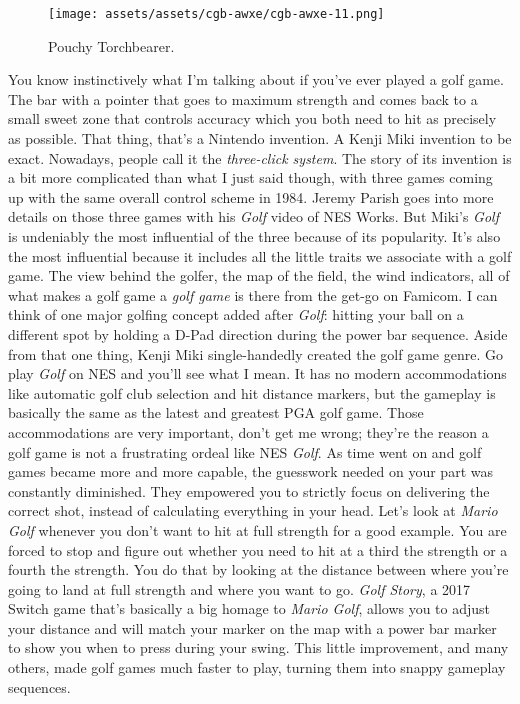 \documentclass{book}
\begin{document}
\begin{figure}[hbt]
\vskip 10pt
\centering \texttt{[image: assets/assets/cgb-awxe/cgb-awxe-11.png]}\par\pagetwodescription Pouchy Torchbearer.
\vskip 6pt
\end{figure}

You know instinctively what I’m talking about if you’ve ever played a golf game. The bar with a pointer that goes to maximum strength and comes back to a small sweet zone that controls accuracy which you both need to hit as precisely as possible. That thing, that’s a Nintendo invention. A Kenji Miki invention to be exact. Nowadays, people call it the \emph{three-click system}. The story of its invention is a bit more complicated than what I just said though, with three games coming up with the same overall control scheme in 1984. Jeremy Parish goes into more details on those three games with his \emph{Golf} video of NES Works. But Miki’s \emph{Golf} is undeniably the most influential of the three because of its popularity. It’s also the most influential because it includes all the little traits we associate with a golf game. The view behind the golfer, the map of the field, the wind indicators, all of what makes a golf game a \emph{golf game} is there from the get-go on Famicom. I can think of one major golfing concept added after \emph{Golf}: hitting your ball on a different spot by holding a D-Pad direction during the power bar sequence. Aside from that one thing, Kenji Miki single-handedly created the golf game genre. Go play \emph{Golf} on NES and you’ll see what I mean. It has no modern accommodations like automatic golf club selection and hit distance markers, but the gameplay is basically the same as the latest and greatest PGA golf game. Those accommodations are very important, don’t get me wrong; they’re the reason a golf game is not a frustrating ordeal like NES \emph{Golf}. As time went on and golf games became more and more capable, the guesswork needed on your part was constantly diminished. They empowered you to strictly focus on delivering the correct shot, instead of calculating everything in your head. Let’s look at \emph{Mario Golf} whenever you don’t want to hit at full strength for a good example. You are forced to stop and figure out whether you need to hit at a third the strength or a fourth the strength. You do that by looking at the distance between where you’re going to land at full strength and where you want to go. \emph{Golf Story}, a 2017 Switch game that’s basically a big homage to \emph{Mario Golf}, allows you to adjust your distance and will match your marker on the map with a power bar marker to show you when to press during your swing. This little improvement, and many others, made golf games much faster to play, turning them into snappy gameplay sequences.
\end{document}
